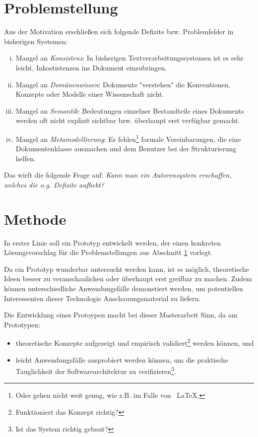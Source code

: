 \section{Problemstellung}\label{sec.problemstellung}

Aus der Motivation erschließen sich folgende Defizite bzw. Problemfelder in bisherigen Systemen:

\begin{enumerate}[(i)]
  \item Mangel an \emph{Konsistenz}: In bisherigen Textverarbeitungssystemen ist es sehr leicht, Inkostistenzen ins Dokument einzubringen.
  \item Mangel an \emph{Domänenwissen}: Dokumente "verstehen" die Konventionen, Konzepte oder Modelle einer Wissenschaft nicht.
  \item Mangel an \emph{Semantik}: Bedeutungen einzelner Bestandteile eines Dokuments werden oft nicht explizit sichtbar bzw. überhaupt erst verfügbar gemacht.
  \item Mangel an \emph{Metamodellierung}: Es fehlen\footnote{Oder gehen nicht weit genug, wie z.B. im Falle von ~\LaTeX.} formale Vereinbarungen, die eine Dokumentenklasse ausmachen und dem Benutzer bei der Strukturierung helfen.
\end{enumerate}

Das wirft die folgende Frage auf:
\emph{Kann man ein Autorensystem erschaffen,
welches die o.g. Defizite aufhebt?}


\section{Methode}

In erster Linie soll ein Prototyp entwickelt werden, der einen konkreten Lösungsvorschlag
für die Problemstellungen aus Abschnitt \ref{sec.problemstellung} vorlegt.

Da ein Prototyp wunderbar untersucht werden kann, ist es möglich, theoretische Ideen
besser zu veranschaulichen oder überhaupt erst greifbar zu machen.
Zudem können unterschiedliche Anwendungsfälle demonstiert werden, um potentiellen Interessenten
dieser Technologie Anschauungsmaterial zu liefern.

Die Entwicklung eines Protoypen macht bei dieser Masterarbeit Sinn, da am Prototypen:

\begin{itemize}
  \item theoretische Konzepte aufgezeigt und empirisch validiert\footnote{Funktioniert das Konzept richtig?} werden können, und
  \item leicht Anwendungsfälle ausprobiert werden können, um die praktische Tauglichkeit der Softwarearchitektur zu verifizieren\footnote{Ist das System richtig gebaut?}.
\end{itemize}


